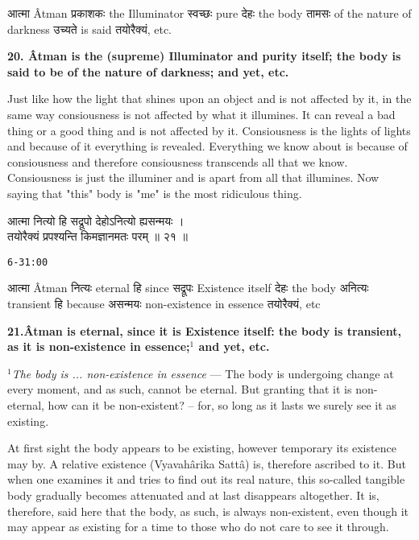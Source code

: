 \documentclass{article}
\begin{document}
\texthindi{आत्मा}
Âtman
\texthindi{प्रकाशकः}
the Illuminator
\texthindi{स्वच्छः}
pure
\texthindi{देहः}
the body
\texthindi{तामसः}
of the nature of darkness
\texthindi{उच्यते}
is said
\texthindi{तयोरैक्यं,}
etc.

\bigskip

\textbf{20. Âtman is the (supreme) Illuminator and purity itself; the body is
said to be of the nature of darkness; and yet, etc.}

\begin{oframed}

    Just like how the light that shines upon an object and is not affected by
    it, in the same way consiousness is not affected by what it illumines. It
    can reveal a bad thing or a good thing and is not affected by it.
    Consiousness is the lights of lights and because of it everything is
    revealed. Everything we know about is because of consiousness and therefore
    consiousness transcends all that we know. Consiousness is just the
    illuminer and is apart from all that illumines. Now saying that "this"
    body is "me" is the most ridiculous thing.

\end{oframed}

\begin{large}
\begin{center}
    \begin{hindi}
    आत्मा नित्यो हि सद्रूपो देहोऽनित्यो ह्यसन्मयः ।\\
    तयोरैक्यं प्रपश्यन्ति किमज्ञानमतः परम् ॥ २१ ॥
    \end{hindi}
\end{center}
\end{large}
\texttt{6-31:00}

\texthindi{आत्मा}
Âtman
\texthindi{नित्यः}
eternal
\texthindi{हि}
since
\texthindi{सद्रूपः}
Existence itself
\texthindi{देहः}
the body
\texthindi{अनित्यः}
transient
\texthindi{हि}
because
\texthindi{असन्मयः}
non-existence in essence
\texthindi{तयोरैक्यं,}
etc

\bigskip

\textbf{21.Âtman is eternal, since it is Existence itself: the body is
transient, as it is non-existence in essence;$^1$ and yet, etc.
}

{\small \textit{$^1$The body is ... non-existence in essence} --- The
body is undergoing change at every moment, and as such, cannot be eternal.
But granting that it is non-eternal, how can it be non-existent? -- for, so
long as it lasts we surely see it as existing.

At first sight the body appears to be existing, however temporary its existence
may by. A relative existence (Vyavahârika Sattâ) is, therefore ascribed to it.
But when one examines it and tries to find out its real nature, this so-called
tangible body gradually becomes attenuated and at last disappears altogether.
It is, therefore, said here that the body, as such, is always non-existent,
even though it may appear as existing for a time to those who do not care to
see it through.

}
\end{document}
